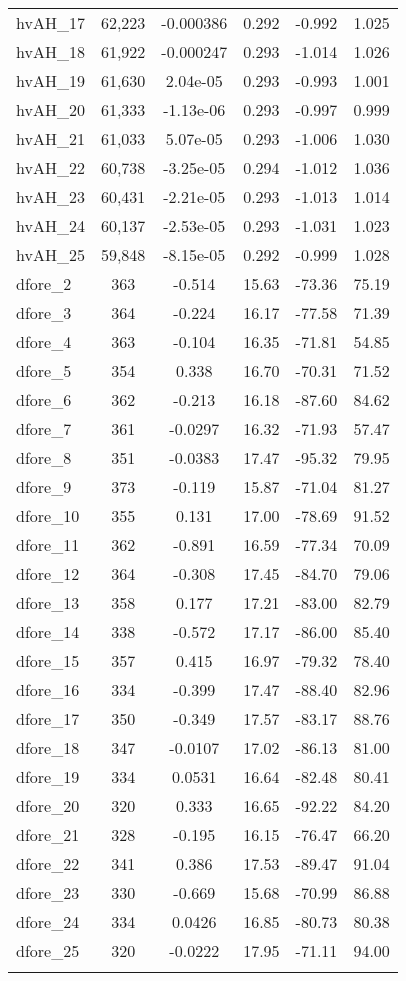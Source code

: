 \begin{tabular}{lccccc}
hvAH\_17 & 62,223 & -0.000386 & 0.292 & -0.992 & 1.025 \\
hvAH\_18 & 61,922 & -0.000247 & 0.293 & -1.014 & 1.026 \\
hvAH\_19 & 61,630 & 2.04e-05 & 0.293 & -0.993 & 1.001 \\
hvAH\_20 & 61,333 & -1.13e-06 & 0.293 & -0.997 & 0.999 \\
hvAH\_21 & 61,033 & 5.07e-05 & 0.293 & -1.006 & 1.030 \\
hvAH\_22 & 60,738 & -3.25e-05 & 0.294 & -1.012 & 1.036 \\
hvAH\_23 & 60,431 & -2.21e-05 & 0.293 & -1.013 & 1.014 \\
hvAH\_24 & 60,137 & -2.53e-05 & 0.293 & -1.031 & 1.023 \\
hvAH\_25 & 59,848 & -8.15e-05 & 0.292 & -0.999 & 1.028 \\
dfore\_2 & 363 & -0.514 & 15.63 & -73.36 & 75.19 \\
dfore\_3 & 364 & -0.224 & 16.17 & -77.58 & 71.39 \\
dfore\_4 & 363 & -0.104 & 16.35 & -71.81 & 54.85 \\
dfore\_5 & 354 & 0.338 & 16.70 & -70.31 & 71.52 \\
dfore\_6 & 362 & -0.213 & 16.18 & -87.60 & 84.62 \\
dfore\_7 & 361 & -0.0297 & 16.32 & -71.93 & 57.47 \\
dfore\_8 & 351 & -0.0383 & 17.47 & -95.32 & 79.95 \\
dfore\_9 & 373 & -0.119 & 15.87 & -71.04 & 81.27 \\
dfore\_10 & 355 & 0.131 & 17.00 & -78.69 & 91.52 \\
dfore\_11 & 362 & -0.891 & 16.59 & -77.34 & 70.09 \\
dfore\_12 & 364 & -0.308 & 17.45 & -84.70 & 79.06 \\
dfore\_13 & 358 & 0.177 & 17.21 & -83.00 & 82.79 \\
dfore\_14 & 338 & -0.572 & 17.17 & -86.00 & 85.40 \\
dfore\_15 & 357 & 0.415 & 16.97 & -79.32 & 78.40 \\
dfore\_16 & 334 & -0.399 & 17.47 & -88.40 & 82.96 \\
dfore\_17 & 350 & -0.349 & 17.57 & -83.17 & 88.76 \\
dfore\_18 & 347 & -0.0107 & 17.02 & -86.13 & 81.00 \\
dfore\_19 & 334 & 0.0531 & 16.64 & -82.48 & 80.41 \\
dfore\_20 & 320 & 0.333 & 16.65 & -92.22 & 84.20 \\
dfore\_21 & 328 & -0.195 & 16.15 & -76.47 & 66.20 \\
dfore\_22 & 341 & 0.386 & 17.53 & -89.47 & 91.04 \\
dfore\_23 & 330 & -0.669 & 15.68 & -70.99 & 86.88 \\
dfore\_24 & 334 & 0.0426 & 16.85 & -80.73 & 80.38 \\
dfore\_25 & 320 & -0.0222 & 17.95 & -71.11 & 94.00 \\
 &  &  &  &  &  \\ \hline
\end{tabular}
